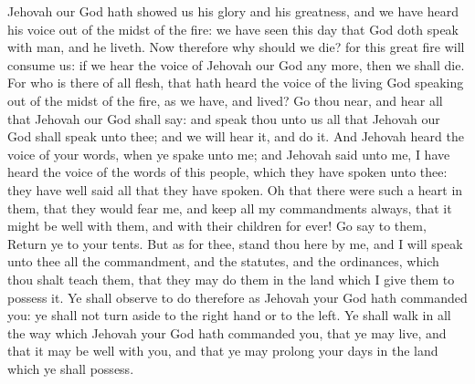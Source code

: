 Jehovah our God hath showed us his glory and his greatness, and we have heard his voice out of the midst of the fire: we have seen this day that God doth speak with man, and he liveth. Now therefore why should we die? for this great fire will consume us: if we hear the voice of Jehovah our God any more, then we shall die. For who is there of all flesh, that hath heard the voice of the living God speaking out of the midst of the fire, as we have, and lived? Go thou near, and hear all that Jehovah our God shall say: and speak thou unto us all that Jehovah our God shall speak unto thee; and we will hear it, and do it.  And Jehovah heard the voice of your words, when ye spake unto me; and Jehovah said unto me, I have heard the voice of the words of this people, which they have spoken unto thee: they have well said all that they have spoken. Oh that there were such a heart in them, that they would fear me, and keep all my commandments always, that it might be well with them, and with their children for ever! Go say to them, Return ye to your tents. But as for thee, stand thou here by me, and I will speak unto thee all the commandment, and the statutes, and the ordinances, which thou shalt teach them, that they may do them in the land which I give them to possess it. Ye shall observe to do therefore as Jehovah your God hath commanded you: ye shall not turn aside to the right hand or to the left. Ye shall walk in all the way which Jehovah your God hath commanded you, that ye may live, and that it may be well with you, and that ye may prolong your days in the land which ye shall possess. 

